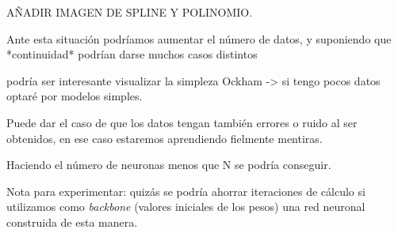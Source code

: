 AÑADIR IMAGEN DE SPLINE Y POLINOMIO. 

Ante esta situación podríamos aumentar el número de datos, 
y suponiendo que *continuidad* podrían darse muchos casos distintos 

podría ser interesante visualizar la simpleza
Ockham -> si tengo pocos datos optaré por modelos simples. 

Puede dar el caso de que los datos tengan también errores o ruido 
al ser obtenidos, en ese caso estaremos aprendiendo fielmente mentiras. 

Haciendo el número de neuronas menos que N se podría conseguir. 

Nota para experimentar: quizás se podría ahorrar iteraciones de 
cálculo si utilizamos como \textit{backbone} (valores iniciales de los pesos) una red neuronal construida de esta manera. 
